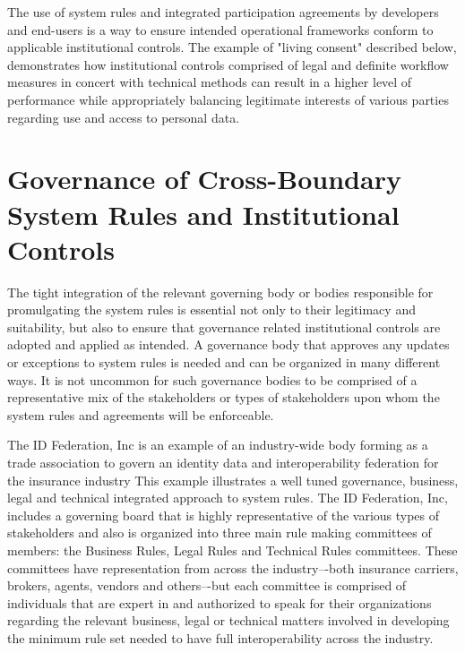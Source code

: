 The use of system rules and integrated participation agreements by developers and end-users is a way to ensure intended operational frameworks conform to applicable institutional controls.
The example of "living consent" described below, demonstrates how institutional controls comprised of legal and definite workflow measures in concert with technical methods can result in a higher level of performance while appropriately balancing legitimate interests of various parties regarding use and access to personal data.

\section{Governance of Cross-Boundary System Rules and Institutional Controls}

The tight integration of the relevant governing body or bodies responsible for promulgating the system rules is essential not only to their legitimacy and suitability, but also to ensure that governance related institutional controls are adopted and applied as intended.
A governance body that approves any updates or exceptions to system rules is needed and can be organized in many different ways.
It is not uncommon for such governance bodies to be comprised of a representative mix of the stakeholders or types of stakeholders upon whom the system rules and agreements will be enforceable.

The ID Federation, Inc is an example of an industry-wide body forming as a trade association to govern an identity data and interoperability federation for the insurance industry This example illustrates a well tuned governance, business, legal and technical integrated approach to system rules.
The ID Federation, Inc, includes a governing board that is highly representative of the various types of stakeholders and also is organized into three main rule making committees of members: the Business Rules, Legal Rules and Technical Rules committees.
These committees have representation from across the industry–-both insurance carriers, brokers, agents, vendors and others–-but each committee is comprised of individuals that are expert in and authorized to speak for their organizations regarding the relevant business, legal or technical matters involved in developing the minimum rule set needed to have full interoperability across the industry.

